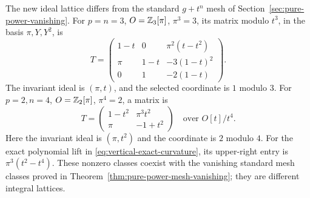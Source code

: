 \begin{example}\label{ex:vertical-pure-power-tests}
The new ideal lattice differs from the standard
\(g+t^n\) mesh of Section~\ref{sec:pure-power-vanishing}.
For \(p=n=3\), \(O=\mathbb Z_3[\pi]\), \(\pi^3=3\), its matrix modulo
\(t^3\), in the basis \(\pi,Y,Y^2\), is
\[
 T=
 \begin{pmatrix}
 1-t&0&\pi^2(t-t^2)\\
 \pi&1-t&-3(1-t)^2\\
 0&1&-2(1-t)
 \end{pmatrix}.
\]
The invariant ideal is \((\pi,t)\), and the selected coordinate
is \(1\) modulo \(3\).
For \(p=2,n=4\), \(O=\mathbb Z_2[\pi]\), \(\pi^4=2\), a matrix is
\[
 T=
 \begin{pmatrix}
 1-t^2&\pi^3t^2\\
 \pi&-1+t^2
 \end{pmatrix}
 \quad\text{over }O[t]/t^4.
\]
Here the invariant ideal is \((\pi,t^2)\) and the coordinate is
\(2\) modulo \(4\).
For the exact polynomial lift in
\eqref{eq:vertical-exact-curvature}, its upper-right entry is
\(\pi^3(t^2-t^4)\).
These nonzero classes coexist with the vanishing standard mesh
classes proved in Theorem~\ref{thm:pure-power-mesh-vanishing}; they are different integral lattices.
\end{example}
